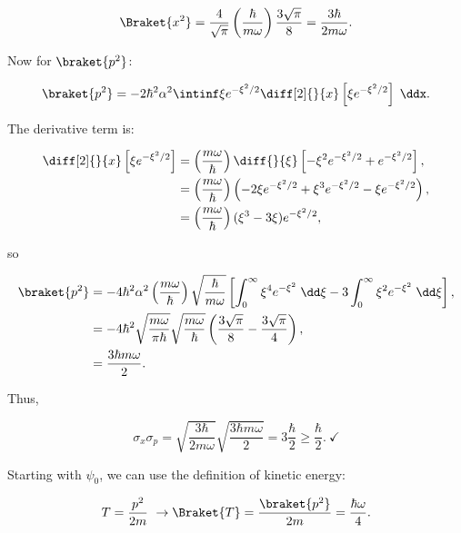 \begin{parts}
\begin{equation*}
    \Braket{x^2} = \frac{4}{\sqrt{\pi}}\left( \frac{\hbar}{m\omega} \right) \frac{3\sqrt{\pi}}{8} = \frac{3\hbar}{2m\omega}.
\end{equation*}

Now for $\braket{p^2}$:

\begin{equation*}
    \braket{p^2} = -2\hbar^2\alpha^2 \intinf \xi e^{-\xi^2/2} \diff[2]{}{x}\left[ \xi e^{-\xi^2/2} \right] \;\ddx.
\end{equation*}

The derivative term is:

\begin{align*}
    \diff[2]{}{x}\left[ \xi e^{-\xi^2/2} \right] &= \left( \frac{m\omega}{\hbar} \right)\diff{}{\xi}\left[ -\xi^2 e^{-\xi^2/2} + e^{-\xi^2/2} \right], \\
    &= \left( \frac{m\omega}{\hbar} \right)\left( -2\xi e^{-\xi^2/2} + \xi^3 e^{-\xi^2/2} - \xi e^{-\xi^2/2} \right),\\
    &= \left( \frac{m\omega}{\hbar} \right)(\xi^3 - 3\xi)e^{-\xi^2/2},
\end{align*}

so

\begin{align*}
    \braket{p^2} &= -4\hbar^2 \alpha^2 \left( \frac{m\omega}{\hbar} \right) \sqrt{\frac{\hbar}{m\omega}} \left[ \int_0^{\infty} \xi^4e^{-\xi^2}\;\dd\xi - 3\int_0^{\infty} \xi^2e^{-\xi^2}\;\dd\xi \right], \\
    &= -4\hbar^2 \sqrt{\frac{m\omega}{\pi\hbar}}\sqrt{\frac{m\omega}{\hbar}} \left( \frac{3\sqrt{\pi}}{8} - \frac{3\sqrt{\pi}}{4} \right), \\
    &= \frac{3\hbar m\omega}{2}.
\end{align*}

Thus,

\begin{equation*}
    \sigma_x\sigma_p = \sqrt{\frac{3\hbar}{2m\omega}} \sqrt{\frac{3\hbar m\omega}{2}} = 3\frac{\hbar}{2} \geq \frac{\hbar}{2}. \ \checkmark
\end{equation*}



\item Starting with $\psi_0$, we can use the definition of kinetic energy:

\begin{equation*}
    T = \frac{p^2}{2m} \ \rightarrow \Braket{T} = \frac{\braket{p^2}}{2m} = \frac{\hbar\omega}{4}.
\end{equation*}


\end{parts}
